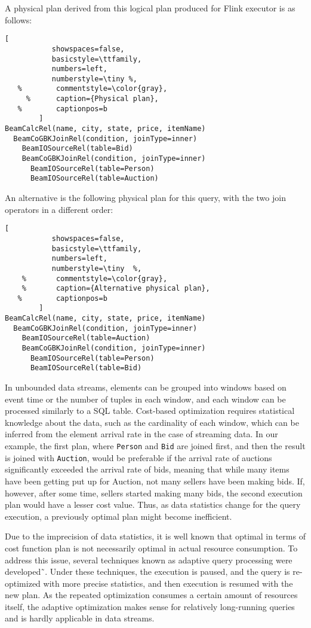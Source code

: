 A physical plan derived from this logical plan produced for Flink executor is as follows:

\begin{lstlisting}[
           showspaces=false,
           basicstyle=\ttfamily,
           numbers=left,
           numberstyle=\tiny %,
   %        commentstyle=\color{gray},
     %      caption={Physical plan}, 
   %        captionpos=b
        ]
BeamCalcRel(name, city, state, price, itemName)
  BeamCoGBKJoinRel(condition, joinType=inner)
    BeamIOSourceRel(table=Bid)
    BeamCoGBKJoinRel(condition, joinType=inner)
      BeamIOSourceRel(table=Person)
      BeamIOSourceRel(table=Auction)
\end{lstlisting}

An alternative is  the following physical plan for this query, with the two join operators in a different order:

\begin{lstlisting}[
           showspaces=false,
           basicstyle=\ttfamily,
           numbers=left,
           numberstyle=\tiny  %,
    %       commentstyle=\color{gray},
    %       caption={Alternative physical plan}, 
   %        captionpos=b
        ]
BeamCalcRel(name, city, state, price, itemName)
  BeamCoGBKJoinRel(condition, joinType=inner)
    BeamIOSourceRel(table=Auction)
    BeamCoGBKJoinRel(condition, joinType=inner)
      BeamIOSourceRel(table=Person)
      BeamIOSourceRel(table=Bid)        
\end{lstlisting}


In unbounded data streams, elements can be grouped into windows based on event time or the number of tuples in each window, and each window can be processed similarly to a SQL table. 
Cost-based optimization requires statistical knowledge about the data, such as the cardinality of each window, which can be inferred from the element arrival rate in the case of streaming data. In our example, the first plan, where \texttt{Person} and \texttt{Bid} are joined first, and then the result is joined with \texttt{Auction}, would be preferable if the arrival rate of auctions significantly exceeded the arrival rate of bids, meaning that while many items have been getting put up for Auction, not many sellers have been making bids. 
If, however, after some time, sellers started making many bids, the second execution plan would have a lesser cost value. Thus, as data statistics change for the query execution, a previously optimal plan might become inefficient. 

Due to the imprecision of data statistics, it is well known that optimal in terms of cost function plan is not necessarily optimal in actual resource consumption. To address this issue, several techniques known as adaptive query processing were developed˜\cite{deshpande2007adaptive}. Under these techniques, the execution is paused, and the query is re-optimized with more precise statistics, and then execution is resumed with the new plan. As the repeated optimization consumes a certain amount of resources itself, the adaptive optimization makes sense for relatively long-running queries and is hardly applicable in data streams. 

